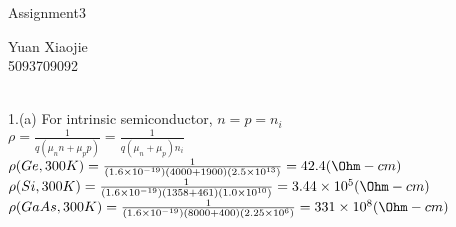 \documentclass[11pt,oneside,a4paper]{article}
\begin{document}
\begin{center}Assignment3\\\end{center}
\begin{flushright}Yuan Xiaojie\\5093709092\\\end{flushright}

\ \\

1.\:(a) For intrinsic semiconductor, \(n=p=n_i\) \\

\hspace{8.5mm} \(\rho=\frac{1}{q(\mu_nn+\mu_pp)}=\frac{1}{q(\mu_n+\mu_p)n_i}\) \\

\hspace{8.5mm} \(\rho(Ge,300K)=\frac{1}{(1.6\times10^{-19})(4000+1900)(2.5\times10^{13})}=42.4 (\Ohm-cm)\) \\

\hspace{8.5mm} \(\rho(Si,300K)=\frac{1}{(1.6\times10^{-19})(1358+461)(1.0\times10^{10})}=3.44\times10^5 (\Ohm-cm)\) \\

\hspace{8.5mm} \(\rho(GaAs,300K)=\frac{1}{(1.6\times10^{-19})(8000+400)(2.25\times10^6)}=331\times10^8 (\Ohm-cm)\) \\

\hspace{8.5mm} \(\) \\
\hspace{8.5mm} \(\) \\
\hspace{8.5mm} \(\) \\
\hspace{8.5mm} \(\) \\
\hspace{8.5mm} \(\) \\
\hspace{8.5mm} \(\) \\
\hspace{8.5mm} \(\) \\
\hspace{8.5mm} \(\) \\
\hspace{8.5mm} \(\) \\
\end{document}
